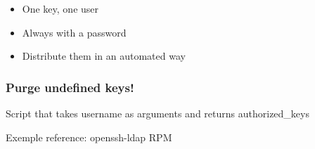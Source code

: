 \begin{frame}[fragile]

\begin{itemize}
    \item One key, one user
    \item Always with a password
    \item Distribute them in an automated way
\end{itemize}
\end{frame}
\begin{frame}[fragile]

\end{frame}
\begin{frame}[fragile]
    
\end{frame}
\begin{frame}[fragile]
    
\end{frame}
\begin{frame}[fragile]
    \frametitle{Purge undefined keys!}
    
\end{frame}
\begin{iframe}[AuthorizedKeysCommand]
\item Script that takes username as arguments and returns authorized\_keys
\item Exemple reference: openssh-ldap RPM
\end{iframe}

